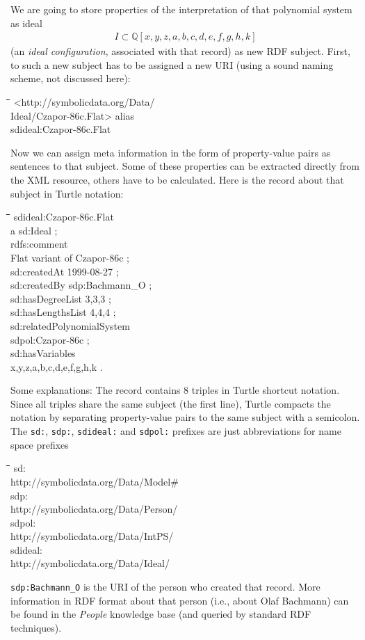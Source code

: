 \documentclass[a4paper,11pt]{article}
\newenvironment{code}{\par\small\tt\footnotesize \begin{tabbing}
\hskip12pt\=\hskip12pt\=\hskip12pt\=\hskip12pt\=\hskip5cm\=\hskip5cm\=\kill}
{\end{tabbing}\normalsize}
\begin{document}
\begin{multicols}{2}
We are going to store properties of the interpretation of that polynomial
system as ideal 
\begin{gather*}
  I\subset \mathbb{Q}[x,y,z,a,b,c,d,e,f,g,h,k]
\end{gather*}
(an \emph{ideal configuration}, associated with that record) as new RDF
subject.  First, to such a new subject has to be assigned a new URI (using a
sound naming scheme, not discussed here):
\begin{code}
  <http://symbolicdata.org/Data/\\\>\> Ideal/Czapor-86c.Flat>
  \textrm{alias}\\\> sdideal:Czapor-86c.Flat
\end{code}
Now we can assign meta information in the form of property-value pairs as
sentences to that subject. Some of these properties can be extracted directly
from the XML resource, others have to be calculated. Here is the record about
that subject in Turtle notation:
\begin{code}
  sdideal:Czapor-86c.Flat\+\\
  a sd:Ideal ;\\ 
  rdfs:comment\\\>\> {\dq}Flat variant of Czapor-86c{\dq} ;\\
  sd:createdAt {\dq}1999-08-27{\dq} ;\\
  sd:createdBy sdp:Bachmann\_O ;\\
  sd:hasDegreeList {\dq}3,3,3{\dq} ;\\
  sd:hasLengthsList {\dq}4,4,4{\dq} ;\\
  sd:relatedPolynomialSystem\\\>\>  sdpol:Czapor-86c ;\\ 
  sd:hasVariables\\\> {\dq}x,y,z,a,b,c,d,e,f,g,h,k{\dq} .
\end{code}
Some explanations: The record contains 8 triples in Turtle shortcut
notation. Since all triples share the same subject (the first line), Turtle
compacts the notation by separating property-value pairs to the same subject
with a semicolon.  The \texttt{sd:}, \texttt{sdp:}, \texttt{sdideal:} and
\texttt{sdpol:} prefixes are just abbreviations for name space prefixes
\begin{code}
  sd:\\\>\> http://symbolicdata.org/Data/Model\#\\[4pt]
  sdp:\\\>\> http://symbolicdata.org/Data/Person/\\[4pt]
  sdpol:\\\>\> http://symbolicdata.org/Data/IntPS/\\[4pt]
  sdideal:\\\>\> http://symbolicdata.org/Data/Ideal/
\end{code}
\texttt{sdp:Bachmann\_O} is the URI of the person who created that record.
More information in RDF format about that person (i.e., about Olaf Bachmann)
can be found in the \emph{People} knowledge base (and queried by standard RDF
techniques).


\end{multicols}
\end{document}
